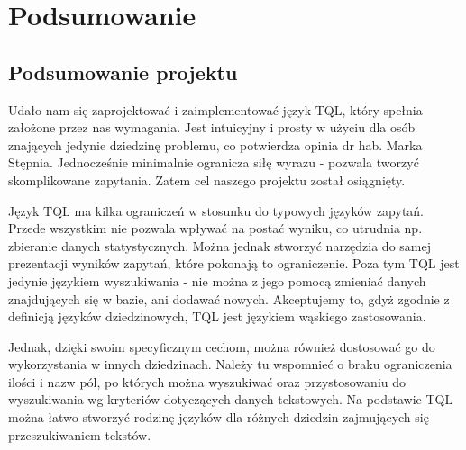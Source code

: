 \chapter*{Podsumowanie}
% 

\section*{Podsumowanie projektu}
Udało nam się zaprojektować i zaimplementować język TQL, który spełnia założone przez nas wymagania. Jest intuicyjny i prosty w użyciu dla osób znających jedynie dziedzinę problemu, co potwierdza opinia dr hab. Marka Stępnia. Jednocześnie minimalnie ogranicza siłę wyrazu - pozwala tworzyć skomplikowane zapytania. Zatem cel naszego projektu został osiągnięty.



Język TQL ma kilka ograniczeń w stosunku do typowych języków zapytań. Przede wszystkim nie pozwala wpływać na postać wyniku, co utrudnia np. zbieranie danych statystycznych. Można jednak stworzyć narzędzia do samej prezentacji wyników zapytań, które pokonają to ograniczenie. Poza tym TQL jest jedynie językiem wyszukiwania - nie można z jego pomocą zmieniać danych znajdujących się w bazie, ani dodawać nowych. Akceptujemy to, gdyż zgodnie z definicją języków dziedzinowych, TQL jest językiem wąskiego zastosowania.


Jednak, dzięki swoim specyficznym cechom, można również dostosować go do wykorzystania w innych dziedzinach. Należy tu wspomnieć o braku ograniczenia ilości i nazw pól, po których można wyszukiwać oraz przystosowaniu do wyszukiwania wg kryteriów dotyczących danych tekstowych. Na podstawie TQL można łatwo stworzyć rodzinę języków dla różnych dziedzin zajmujących się przeszukiwaniem tekstów.


